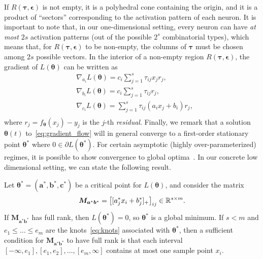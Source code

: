 If $R(\bm \tau, \bm \epsilon)$ is not empty, it is a polyhedral cone containing the origin, and it is a product of ``sectors'' corresponding to the activation pattern of each neuron. It is important to note that, in our one-dimensional setting, every neuron can have \emph{at most} $2s$ activation patterns (out of the possible $2^s$ combinatorial types), which means that, for $R(\bm \tau, \bm \epsilon)$ to be non-empty, the columns of $\bm \tau$ must be chosen among $2s$ possible vectors.
In the interior of a non-empty region $R(\bm \tau, \bm \epsilon)$, the gradient of $L(\bm \theta)$ can be written as
\begin{equation}\label{eq:derivative_equations}
\begin{aligned}
&\nabla_{a_i}L(\bm \theta) = c_i \sum_{j=1}^s \tau_{ij} x_j r_j,\\
&\nabla_{b_i}L(\bm \theta) = c_i \sum_{j=1}^s \tau_{ij} r_j,\\
&\nabla_{c_i}L(\bm \theta) = \sum_{j=1}^s \tau_{ij} (a_i x_j + b_i) r_j,\\
\end{aligned}
\end{equation}
where $r_j = f_{\bm \theta}(x_j) - y_j$ is the $j$-th \emph{residual}. Finally, we remark that a solution $\bm \theta(t)$ to~\eqref{eq:gradient_flow} will in general converge to a first-order stationary point $\bm \theta^*$ where $0 \in \partial L(\bm \theta^*)$. For certain asymptotic (highly over-parameterized) regimes, it is possible to show convergence to global optima~\cite{du2018gradient,chizat2018global}. In our concrete low dimensional setting, we can state the following result.

\begin{proposition} Let $\bm \theta^* = (\bm a^*, \bm b^*, \bm c^*)$ be a critical point for $L(\bm \theta)$, and consider the matrix
\begin{equation}
    \bm M_{\bm a^* \bm b^*} = \big [ [a_j^* x_i + b_j^*]_+ \big ]_{ij} \in \mathbb{R}^{s \times m}.
\end{equation}
If $\bm M_{\bm a^* \bm b^*}$ has full rank, then $L(\bm \theta^*) = 0$, so $\bm \theta^*$ is a global minimum. If $s< m$ and $e_1 \le \ldots \le e_m$ are the knots~\eqref{eq:knots} associated with $\bm \theta^*$, then a sufficient condition for $\bm M_{\bm a^* \bm b^*}$ to have full rank is that each interval $[-\infty, e_1],[e_1,e_2],\ldots,[e_m,\infty]$ contains at most one sample point $x_i$.
\end{proposition}





